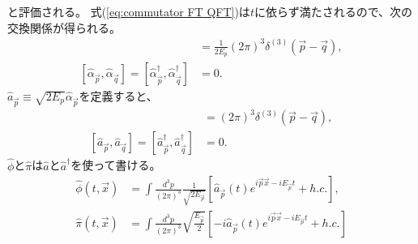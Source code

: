 \documentclass[10pt,a4paper]{jarticle}
\begin{document}
と評価される。
式(\ref{eq:commutator FT QFT})は$t$に依らず満たされるので、次の交換関係が得られる。
\begin{align}
[\hat \alpha_{\vec p}, \hat \alpha_{\vec q}^\dagger] &= \frac{1}{2E_p} (2\pi)^3 \delta^{(3)}(\vec p - \vec q), \\
[\hat \alpha_{\vec p}, \hat \alpha_{\vec q}] = [\hat \alpha_{\vec p}^\dagger, \hat \alpha_{\vec q}^\dagger] &= 0.
\end{align}
$\hat a_{\vec p} \equiv  \sqrt{2E_p} \hat \alpha_{\vec p}$を定義すると、
\begin{align}
[\hat a_{\vec p}, \hat a_{\vec q}^\dagger] &= (2\pi)^3 \delta^{(3)}(\vec p - \vec q), \\
[\hat a_{\vec p}, \hat a_{\vec q}] = [\hat a_{\vec p}^\dagger, \hat a_{\vec q}^\dagger] &= 0.
\end{align}
%
$\hat \phi$と$\hat\pi$は$\hat a$と$\hat a^\dagger$を使って書ける。
\begin{align}
\hat\phi(t,\vec x) &= \int \frac{d^3 p}{(2\pi)^3} \frac{1}{\sqrt{2E_{\vec p}}}\left[ {\hat a}_{\vec p}(t) e^{i\vec p \vec x - iE_{\vec p} t}+ h.c. \right], \label{eq:phi QFT}\\
\hat\pi(t,\vec x) &= \int \frac{d^3 p}{(2\pi)^3} \sqrt{ \frac{E_{\vec p}}{2}  }\left[ -i{\hat a}_{\vec p}(t) e^{i\vec p \vec x - iE_{\vec p} t}+ h.c. \right] \label{eq:pi QFT}
\end{align}
\end{document}
